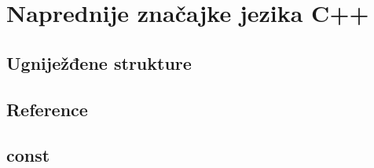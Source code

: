 \chapter{Naprednije značajke jezika C++}

\section{Ugniježđene strukture}

\section{Reference}

\section{const}